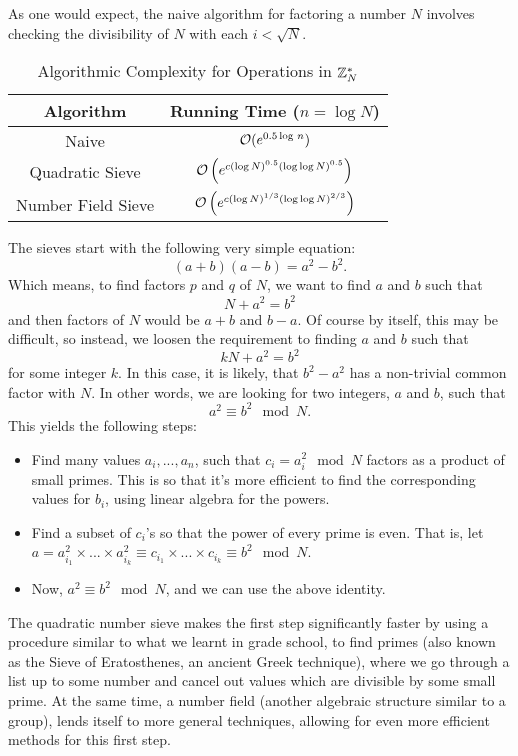 As one would expect, the naive algorithm for factoring a number $N$ involves checking the divisibility of $N$ with each $i<\sqrt{N}$.
\begin{table}[H]
\centering
\begin{tabular}{c | c}
\textbf{Algorithm} & \textbf{Running Time} ($n = \log N$) \\ \hline
Naive & ${\cal O}(e^{0.5\log\, n})$ \\
Quadratic Sieve & ${\cal O}\left(e^{c (\log N)^{0.5}(\log \log N)^{0.5}}\right)$ \\
Number Field Sieve & ${\cal O}\left(e^{c (\log N)^{1/3}(\log \log N)^{2/3}}\right)$
\end{tabular}
\caption{Algorithmic Complexity for Operations in ${{\mathbb Z}}_N^*$}
\label{table:factoringAlgs}
\end{table}

The sieves start with the following very simple equation:
\[
(a+b)(a-b) = a^2 - b^2.
\]
Which means, to find factors $p$ and $q$ of $N$, we want to find $a$ and $b$ such that 
\[
N + a^2 = b^2
\]
and then factors of $N$ would be $a+b$ and $b - a$. Of course by itself, this may be difficult, so instead, we loosen the requirement to finding $a$ and $b$ such that
\[
kN + a^2 = b^2
\]
for some integer $k$. In this case, it is likely, that $b^2 - a^2$ has a non-trivial common factor with $N$. In other words, we are looking for two integers, $a$ and $b$, such that 
\[
a^2\equiv b^2 \mod N.
\]
This yields the following steps:
\begin{itemize}
\item Find many values $a_i, ..., a_n$, such that $c_i = a_i^2\mod N$ factors as a product of small primes. This is so that it's more efficient to find the corresponding values for $b_i$, using linear algebra for the powers.
\item Find a subset of $c_i$'s so that the power of every prime is even. That is, let $a = a_{i_1}^2\times ...\times a_{i_k}^2\equiv c_{i_1}\times ...\times c_{i_k} \equiv b^2\mod N$.
\item Now, $a^2\equiv b^2\mod N$, and we can use the above identity.
\end{itemize}
The quadratic number sieve makes the first step significantly faster by using a procedure similar to what we learnt in grade school, to find primes (also known as the Sieve of Eratosthenes, an ancient Greek technique), where we go through a list up to some number and cancel out values which are divisible by some small prime. At the same time, a number field (another algebraic structure similar to a group), lends itself to more general techniques, allowing for even more efficient methods for this first step.

